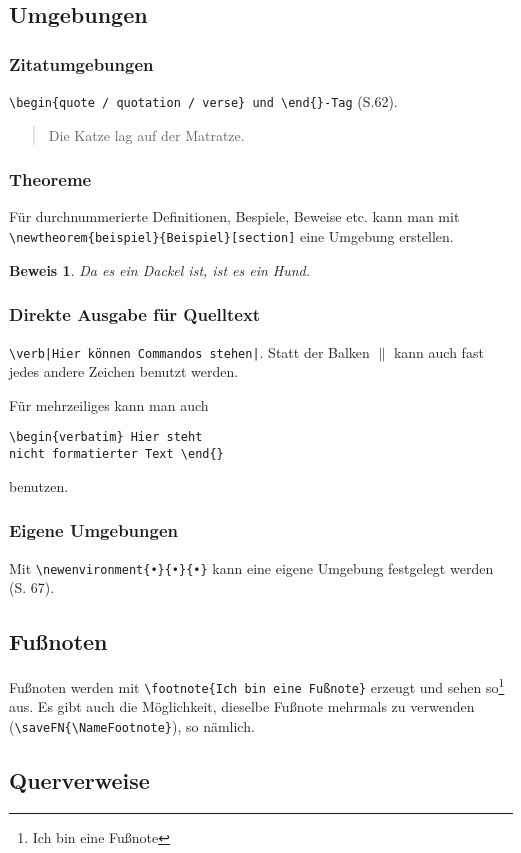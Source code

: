\documentclass[10pt,a4paper]{article}
\newtheorem{beweis}{Beweis}[section]
\begin{document}
\subsection{Umgebungen}

\subsubsection{Zitatumgebungen}
\verb|\begin{quote / quotation / verse} und \end{}-Tag| (S.62).
\begin{quote}
Die Katze lag auf der Matratze.
\end{quote}

\subsubsection{Theoreme}
Für durchnummerierte Definitionen, Bespiele, Beweise etc. kann man mit \verb|\newtheorem{beispiel}{Beispiel}[section]| eine Umgebung erstellen.
\begin{beweis}
Da es ein Dackel ist, ist es ein Hund.
\end{beweis}

\subsubsection{Direkte Ausgabe für Quelltext}
\verb+\verb|Hier können Commandos stehen|+.
Statt der Balken $\|$ kann auch fast jedes andere Zeichen benutzt werden.

\bigskip

Für mehrzeiliges kann man auch \begin{verbatim}
\begin{verbatim} Hier steht
nicht formatierter Text \end{}
\end{verbatim} benutzen.


\subsubsection{Eigene Umgebungen}

Mit \verb|\newenvironment{•}{•}{•}| kann eine eigene Umgebung festgelegt werden (S. 67).


\subsection{Fußnoten}

Fußnoten werden mit \verb+\footnote{Ich bin eine Fußnote}+ erzeugt und sehen so\footnote{Ich bin eine Fußnote} aus. Es gibt auch die Möglichkeit, dieselbe Fußnote mehrmals zu verwenden (\verb+\saveFN{\NameFootnote}+), so nämlich.



\subsection{Querverweise}
\end{document}
